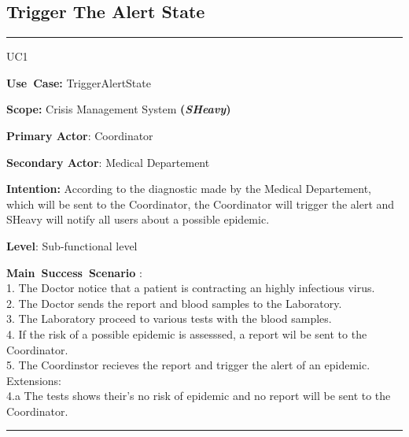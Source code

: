 \subsection{Trigger The Alert State}
\vspace{0.5cm}
\hrule
\vspace{0.5cm}
\begin{lyxlist}{UC1}
\small{
\item [\textbf{Use~Case:}] TriggerAlertState
\item [\textbf{Scope:}] Crisis Management System \textbf{(\emph{SHeavy})}
\item [\textbf{Primary Actor}:] Coordinator
\item [\textbf{Secondary Actor}:] Medical Departement
\item [\textbf{Intention:}] According to the diagnostic made by the Medical
Departement, which will be sent to the Coordinator, the Coordinator will trigger
the alert and SHeavy will notify all users about a possible epidemic.
\item [\textbf{Level}:]Sub-functional level
\item [\textbf{Main~Success~Scenario}]:\\
1. The Doctor notice that a patient is contracting an highly infectious virus.\\
2. The Doctor sends the report and blood samples to the Laboratory.\\
3. The Laboratory proceed to various tests with the blood samples.\\
4. If the risk of a possible epidemic is assesssed, a report wil be sent to
the Coordinator.\\
5. The Coordinstor recieves the report and trigger the alert of an epidemic.\\
Extensions:\\
4.a The tests shows their's no risk of epidemic and no report will be sent to
the Coordinator.\\
}
\end{lyxlist}
\hrule 
\vspace{0.5cm} 

